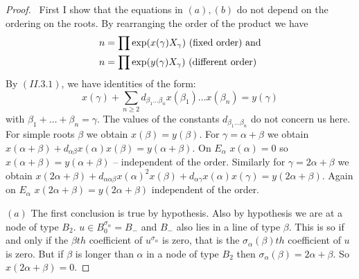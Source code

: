 \documentclass{memo-l}
\theoremstyle{definition}
\theoremstyle{remark}
\numberwithin{section}{chapter}
\numberwithin{equation}{chapter}
\begin{document}
\begin{proof} \ First I show that the equations in $(a),(b)$ do not
depend on the ordering on the roots.  By rearranging the order of the
product we have
$$
\aligned
n & = \prod \exp(x({\gamma})X_{{\gamma}})\ {\text{(fixed\ order)\ and}}\\
n & = \prod \exp(y({\gamma})X_{{\gamma}})\ {\text{(different\ order)}}
\endaligned
$$
By $(II.3.1)$, we have identities of the form:
$$
x({\gamma}) + \sum_{n \ge 2} d_{{\beta}_{1}\ldots
{\beta}_{n}} x({\beta}_{1})\ldots x({\beta}_{n}) = y({\gamma})
$$
with ${\beta}_{1}+\ldots +{\beta}_{n} = {\gamma}$.  The values of the
constants $d_{{\beta}_{1}\ldots {\beta}_{n}}$ do not concern us here.
For simple roots ${\beta}$ we obtain $x({\beta}) = y({\beta})$.  For
${\gamma} = {\alpha}+{\beta}$ we obtain $x({\alpha}+{\beta}) +
d_{{\alpha}{\beta}}x({\alpha})x({\beta}) = y({\alpha}+{\beta})$.  On
$E_{{\alpha}}$ $x({\alpha}) = 0$ so $x({\alpha}+{\beta}) =
y({\alpha}+{\beta})$ -- independent of the order.  Similarly for ${\gamma} =
2{\alpha}+{\beta}$ we obtain $x(2{\alpha}+{\beta}) +
d_{{\alpha}{\alpha}{\beta}}x({\alpha})^{2}x({\beta}) +
d_{{\alpha}{\gamma}}x({\alpha})x({\gamma}) = y(2{\alpha}+{\beta})$.  Again
on $E_{{\alpha}}$ $x(2{\alpha}+{\beta}) = y(2{\alpha}+{\beta})$ independent
of the order.

   $(a)$ The first conclusion is true by hypothesis.  Also by hypothesis we
are at a node of type $B_{2}$.  $u  \in  B_{0}^{{\sigma}_{{\alpha}}} =
B_{-}$ and $B_{-}$ also lies in a line of type ${\beta}$.  This is so if
and only if the ${\beta}th$ coefficient of $u^{{\sigma}_{{\alpha}}}$
is zero, that is the ${\sigma}_{{\alpha}}({\beta})th$ coefficient of $u$ is
zero.  But if ${\beta}$ is longer than ${\alpha}$ in a node of type $B_{2}$
then ${\sigma}_{{\alpha}}({\beta}) = 2{\alpha}+{\beta}$.  So
$x(2{\alpha}+{\beta}) = 0$.


\end{proof}
\end{document}
